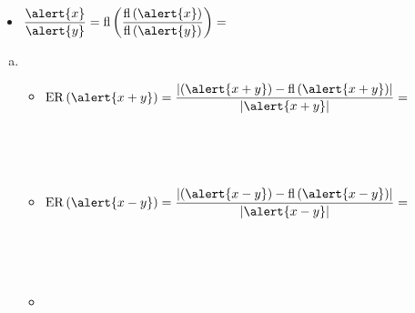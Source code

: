 \begin{frame}
\begin{solution}
\begin{enumerate}[c)]
\begin{multicols}{2}
\begin{itemize}
					            \

					      \item

					            \begin{math}
						            \dfrac{\alert{x}}{\alert{y}}=
						            \operatorname{fl}
						            \left(
						            \dfrac{
							            \operatorname{fl}\left(\alert{x}\right)
						            }{
							            \operatorname{fl}\left(\alert{y}\right)
						            }
						            \right)=
					            \end{math}
				      \end{itemize}
			      \end{multicols}
		\end{enumerate}

		\begin{enumerate}[d)]
			\item

			      \begin{itemize}
				      \item

				            \begin{math}
					            \operatorname{ER}\left(\alert{x+y}\right)=
					            \dfrac{
						            \left|
						            \left(\alert{x+y}\right)-
						            \operatorname{fl}\left(\alert{x+y}\right)
						            \right|
					            }{
						            \left|
						            \alert{x+y}
						            \right|
					            }=
				            \end{math}

				            \

				            \

				      \item

				            \begin{math}
					            \operatorname{ER}\left(\alert{x-y}\right)=
					            \dfrac{
						            \left|
						            \left(\alert{x-y}\right)-
						            \operatorname{fl}\left(\alert{x-y}\right)
						            \right|
					            }{
						            \left|
						            \alert{x-y}
						            \right|
					            }=
				            \end{math}

				            \

				            \

				      \item


\end{itemize}
\end{enumerate}
\end{solution}
\end{frame}

